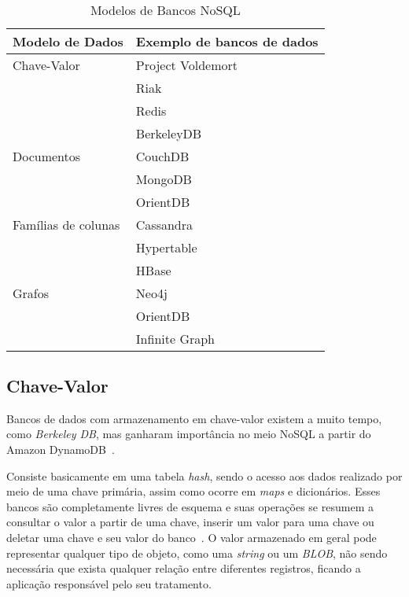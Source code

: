 ~\begin{table}[]
\centering
\caption{Modelos de Bancos NoSQL}
\label{tab:modelosnosql}
\begin{tabular}{ll}
\textbf{Modelo de Dados}     & \textbf{Exemplo de bancos de dados}      \\ \hline
Chave-Valor         & Project Voldemort               \\
                    & Riak                            \\
                    & Redis                           \\
                    & BerkeleyDB                      \\ \hline
Documentos          & CouchDB                         \\
                    & MongoDB                         \\
                    & OrientDB                        \\ \hline
Famílias de colunas & Cassandra                       \\
					& Hypertable                      \\
                    & HBase                           \\ \hline
Grafos              & Neo4j \\
                    & OrientDB                        \\
                    & Infinite Graph                 
\end{tabular}
\end{table}

\subsection*{Chave-Valor}
Bancos de dados com armazenamento em chave-valor existem a muito tempo, como \emph{Berkeley DB}, mas ganharam importância no meio NoSQL a partir do Amazon DynamoDB~\cite{chrisnosql}.

Consiste basicamente em uma tabela \emph{hash}, sendo o acesso aos dados realizado por meio de uma chave primária, assim como ocorre em \emph{maps} e dicionários.  Esses bancos são completamente livres de esquema e suas operações se resumem a consultar o valor a partir de uma chave, inserir um valor para uma chave ou deletar uma chave e seu valor do banco~\cite{nosqleval}. O valor armazenado em geral pode representar qualquer tipo de objeto, como uma \emph{string} ou um \emph{BLOB}, não sendo necessária que exista qualquer relação entre diferentes registros, ficando a aplicação responsável pelo seu tratamento. 

